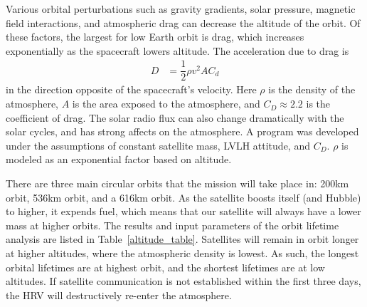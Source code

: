 \documentclass[onecolumn,10pt]{jhwhw}
\begin{document}
Various orbital perturbations such as gravity gradients, solar pressure, magnetic field interactions, and atmospheric drag can decrease the altitude of the orbit. Of these factors, the largest for low Earth orbit is drag, which increases exponentially as the spacecraft lowers altitude. The acceleration due to drag is
\begin{align*}
D &= \dfrac{1}{2} \rho v^2 A C_d
\end{align*}
in the direction opposite of the spacecraft's velocity. Here $\rho$ is the density of the atmosphere, $A$ is the area exposed to the atmosphere, and $C_D \approx 2.2$ is the coefficient of drag. The solar radio flux can also change dramatically with the solar cycles, and has strong affects on the atmosphere. A program was developed under the assumptions of constant satellite mass, LVLH attitude, and $C_D$. $\rho$ is modeled as an exponential factor based on altitude.

There are three main circular orbits that the mission will take place in: 200km orbit, 536km orbit, and a 616km orbit. As the satellite boosts itself (and Hubble) to higher, it expends fuel, which means that our satellite will always have a lower mass at higher orbits. The results and input parameters of the orbit lifetime analysis are listed in Table~\ref{altitude_table}. Satellites will remain in orbit longer at higher altitudes, where the atmospheric density is lowest. As such, the longest orbital lifetimes are at highest orbit, and the shortest lifetimes are at low altitudes. If satellite communication is not established within the first three days, the HRV will destructively re-enter the atmosphere.

\end{document}
